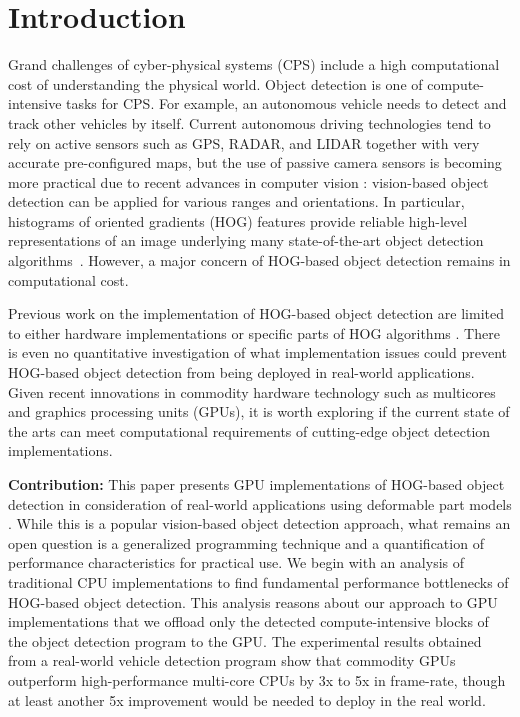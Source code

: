 \section{Introduction}
\label{sec:introduction}

Grand challenges of cyber-physical systems (CPS) include a high
computational cost of understanding the physical world.
Object detection is one of compute-intensive tasks for CPS.
For example, an autonomous vehicle needs to detect and track other
vehicles by itself.
Current autonomous driving technologies \cite{Guizzo11, Levinson11,
Urmson08} tend to rely on active sensors such as GPS, RADAR, and LIDAR
\cite{Kirchner00, Streller02} together with very accurate pre-configured
maps, but the use of passive camera sensors is becoming more practical
due to recent advances in computer vision \cite{Dalal05, Felzenszwalb05,
Felzenszwalb10}: vision-based object detection can be applied for
various ranges and orientations.
In particular, histograms of oriented gradients (HOG) \cite{Dalal05}
features provide reliable high-level representations of an image
underlying many state-of-the-art object detection
algorithms~\cite{Felzenszwalb10, Geiger12, Rybski10, Suard06, Zhu06}.
However, a major concern of HOG-based object detection remains in
computational cost.

Previous work on the implementation of HOG-based object detection are
limited to either hardware implementations \cite{Kadota09, Karakaya09,
Komorkiewicz12} or specific parts of HOG algorithms \cite{Chen11,
Prisacariu09}.
There is even no quantitative investigation of what implementation
issues could prevent HOG-based object detection from being deployed in
real-world applications.
Given recent innovations in commodity hardware technology such as
multicores and graphics processing units (GPUs), it is worth
exploring if the current state of the arts can meet computational
requirements of cutting-edge object detection implementations.

\textbf{Contribution:}
This paper presents GPU implementations of HOG-based object detection in
consideration of real-world applications using deformable part models
\cite{Felzenszwalb10}.
While this is a popular vision-based object detection approach, what
remains an open question is a generalized programming technique and a
quantification of performance characteristics for practical use.
We begin with an analysis of traditional CPU
implementations to find fundamental performance bottlenecks of HOG-based
object detection.
This analysis reasons about our approach to GPU implementations that we
offload only the detected compute-intensive blocks of the object
detection program to the GPU.
The experimental results obtained from a real-world vehicle detection
program show that commodity GPUs outperform high-performance multi-core
CPUs by 3x to 5x in frame-rate, though at least another 5x improvement
would be needed to deploy in the real world.

